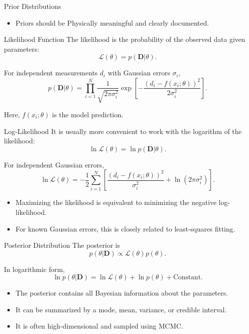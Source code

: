 \documentclass[a4paper, 10pt, onepage]{elegantbook}
\begin{document}
{\begin{frame}{Prior Distributions}
  \begin{itemize}
    \item Priors should be Physically meaningful and clearly documented.
  \end{itemize}
\end{frame}

\begin{frame}{Likelihood Function}
  The likelihood is the probability of the observed data given parameters:
  \[
    \mathcal{L}(\theta)
    =
    p(\mathbf{D}|\theta).
  \]

  For independent measurements \(d_i\) with Gaussian errors \(\sigma_i\),
  \[
    p(\mathbf{D}|\theta)
    =
    \prod_{i=1}^{N}
    \frac{1}{\sqrt{2\pi\sigma_i^2}}
    \exp\left[
      -\frac{
        \left(d_i-f(x_i;\theta)\right)^2
      }{
        2\sigma_i^2
      }
    \right].
  \]

  Here, \(f(x_i;\theta)\) is the model prediction.
\end{frame}

\begin{frame}{Log-Likelihood}
  It is usually more convenient to work with the logarithm of the likelihood:
  \[
    \ln\mathcal{L}(\theta)
    =
    \ln p(\mathbf{D}|\theta).
  \]

  For independent Gaussian errors,
  \[
    \ln\mathcal{L}(\theta)
    =
    -\frac{1}{2}
    \sum_{i=1}^{N}
    \left[
      \frac{
        \left(d_i-f(x_i;\theta)\right)^2
      }{
        \sigma_i^2
      }
      +
      \ln(2\pi\sigma_i^2)
    \right].
  \]

  \begin{itemize}
    \item Maximizing the likelihood is equivalent to minimizing the negative log-likelihood.
    \item For known Gaussian errors, this is closely related to least-squares fitting.
  \end{itemize}
\end{frame}

\begin{frame}{Posterior Distribution}
  The posterior is
  \[
    p(\theta|\mathbf{D})
    \propto
    \mathcal{L}(\theta)p(\theta).
  \]

  In logarithmic form,
  \[
    \ln p(\theta|\mathbf{D})
    =
    \ln\mathcal{L}(\theta)
    +
    \ln p(\theta)
    +
    \text{Constant}.
  \]

  \begin{itemize}
    \item The posterior contains all Bayesian information about the parameters.
    \item It can be summarized by a mode, mean, variance, or credible interval.
    \item It is often high-dimensional and sampled using MCMC.
  \end{itemize}
\end{frame}

}
\end{document}
